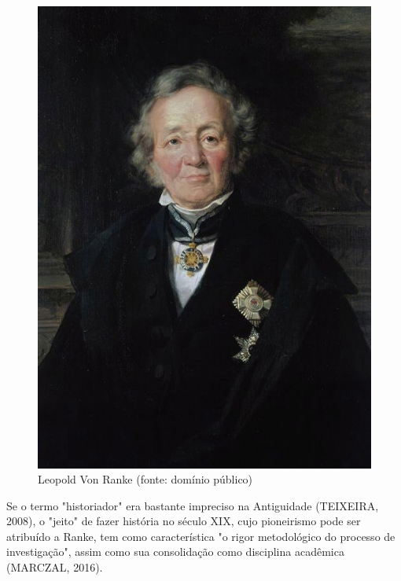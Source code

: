 \captionsetup{format=plain}
\begin{figure}[htb]

\centering


\begin{minipage}[b]{0.4\linewidth}
        \centering
                \includegraphics[width=1.0\linewidth]{../../../imagens/ranke.jpg}
                \caption{Leopold Von Ranke (fonte: domínio público)}
                \label{e978df58deaf86ca4da4073fca97b28afd4d3a3b}
\end{minipage}%
\hspace{0.5cm}
\end{figure}



Se o termo "historiador" era bastante impreciso na Antiguidade (TEIXEIRA, 2008), o "jeito" de fazer história no século XIX, cujo pioneirismo pode ser atribuído a Ranke, tem como característica "o rigor metodológico do processo de investigação", assim como sua consolidação como disciplina acadêmica (MARCZAL, 2016).

